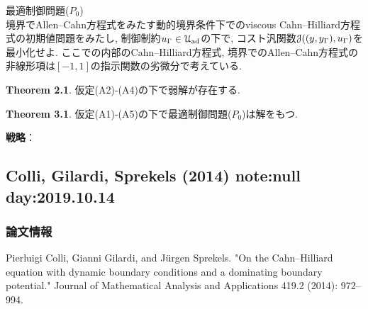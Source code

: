 \documentclass[openary, a4paper, oneside]{jsarticle}
\begin{document}
最適制御問題($P_0$)\\
境界でAllen--Cahn方程式をみたす動的境界条件下でのviscous Cahn--Hilliard方程式の初期値問題をみたし,
制御制約$u_{\Gamma}\in \mathcal{U}_{\mathrm{ad}}$の下で,
コスト汎関数$\mathcal{J}((y,y_{\Gamma}),u_{\Gamma})$を最小化せよ.
ここでの内部のCahn--Hilliard方程式, 境界でのAllen--Cahn方程式の非線形項は$[-1,1]$の指示関数の劣微分で考えている.

{\bf Theorem 2.1}.
仮定(A2)-(A4)の下で弱解が存在する.

{\bf Theorem 3.1}.
仮定(A1)-(A5)の下で最適制御問題($P_0$)は解をもつ.

{\bf 戦略}：



\newpage

\subsection{Colli, Gilardi, Sprekels (2014) \cite{ColliGilardiSprekels2014} note:null day:2019.10.14}
	\subsubsection{論文情報}
	Pierluigi Colli, Gianni Gilardi, and J\"urgen Sprekels. "On the Cahn--Hilliard equation with dynamic boundary conditions and a dominating boundary potential." Journal of Mathematical Analysis and Applications 419.2 (2014): 972--994.		
\end{document}
